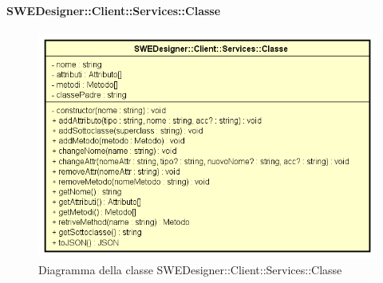           	\paragraph{SWEDesigner::Client::Services::Classe}
          	\begin{figure}[h!]
			\centering
			\includegraphics[scale=0.8]{Classi/SWEDesigner__Client__Services__Classe.png}
			\caption{Diagramma della classe SWEDesigner::Client::Services::Classe}
 			\end{figure}
